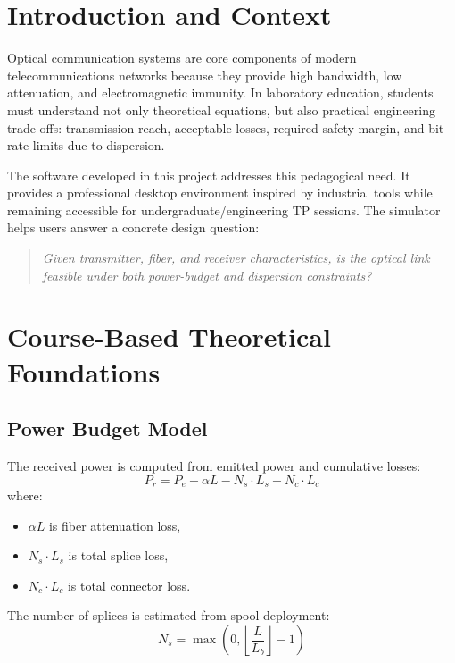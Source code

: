 \documentclass[11pt,a4paper]{article}
\begin{document}
\newpage

\section{Introduction and Context}
Optical communication systems are core components of modern telecommunications networks because they provide high bandwidth, low attenuation, and electromagnetic immunity. In laboratory education, students must understand not only theoretical equations, but also practical engineering trade-offs: transmission reach, acceptable losses, required safety margin, and bit-rate limits due to dispersion.

The software developed in this project addresses this pedagogical need. It provides a professional desktop environment inspired by industrial tools while remaining accessible for undergraduate/engineering TP sessions. The simulator helps users answer a concrete design question:
\begin{quote}
\textit{Given transmitter, fiber, and receiver characteristics, is the optical link feasible under both power-budget and dispersion constraints?}
\end{quote}

\section{Course-Based Theoretical Foundations}
\subsection{Power Budget Model}
The received power is computed from emitted power and cumulative losses:
\begin{equation}
P_r = P_e - \alpha L - N_s \cdot L_s - N_c \cdot L_c
\end{equation}
where:
\begin{itemize}[leftmargin=1.2cm]
  \item $\alpha L$ is fiber attenuation loss,
  \item $N_s \cdot L_s$ is total splice loss,
  \item $N_c \cdot L_c$ is total connector loss.
\end{itemize}

The number of splices is estimated from spool deployment:
\begin{equation}
N_s = \max\left(0,\left\lfloor\frac{L}{L_b}\right\rfloor - 1\right)
\end{equation}
\end{document}
